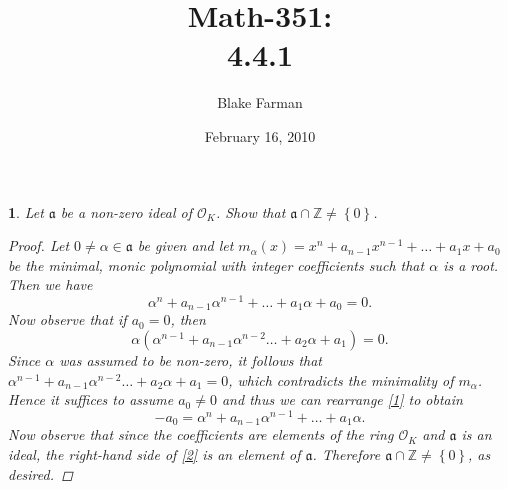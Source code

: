 \documentclass[10pt]{amsart}
\author{Blake Farman}
\title{Math-351:\\4.4.1}
\date{February 16, 2010}\pdfpagewidth 8.5in
\begin{document}
\maketitle

\newcommand{\Z}{\mathbb{Z}}
\newcommand{\R}{\mathbb{R}}
\newcommand{\Q}{\mathbb{Q}}

\renewcommand{\qedsymbol}{\(\blacksquare\)}
\newcommand{\znz}[1]{\Z / #1\Z}
\newcommand{\mznz}[1]{(\Z / #1\Z)^*}

\renewcommand{\phi}{\varphi}
\newenvironment{alphaenum}{
  \begin{enumerate}
    \renewcommand{\theenumi}{(\alph{enumi})}
    \renewcommand{\labelenumi}{\theenumi}
  }
  {\end{enumerate}}

\newcommand{\quadeq}[3]{\frac{-(#2) \pm \sqrt{(#2)^2 - 4(#1)(#3)}}{2(#3)}}

\newtheorem{thm}{}

\newcommand{\A}{\mathfrak{a}}
\begin{thm}
  Let $\A$ be a non-zero ideal of $\mathcal{O}_K$.  Show that $\mathfrak{a} \cap \Z \not = \left\{ 0 \right\}$.
  \begin{proof}
    Let $0 \not =\alpha \in \A$ be given and let $m_{\alpha}(x) = x^n + a_{n-1}x^{n-1} + \ldots + a_1x + a_0$ be the minimal, monic polynomial with integer coefficients such that $\alpha$ is a root.
    Then we have 
    \begin{equation}
      \label{1}
      \alpha^n + a_{n-1}\alpha^{n-1} + \ldots + a_1\alpha + a_0 = 0.
    \end{equation}
    Now observe that if $a_0 = 0$, then 
    $$\alpha(\alpha^{n-1} + a_{n-1}\alpha^{n-2} \ldots + a_2\alpha + a_1) = 0.$$
    Since $\alpha$ was assumed to be non-zero, it follows that $\alpha^{n-1} + a_{n-1}\alpha^{n-2} \ldots + a_2\alpha + a_1 = 0$, which contradicts the minimality of $m_{\alpha}$.
    Hence it suffices to assume $a_0 \not = 0$ and thus we can rearrange \eqref{1} to obtain
    \begin{equation}
      \label{2}
      -a_0 = {\alpha}^{n} + a_{n-1}{\alpha}^{n-1} + \ldots + a_1\alpha.
    \end{equation}
    Now observe that since the coefficients are elements of the ring $\mathcal{O}_K$ and $\mathfrak{a}$ is an ideal, the right-hand side of \eqref{2} is an element of $\mathfrak{a}$.
    Therefore $\mathfrak{a} \cap \Z \not = \left\{0\right\}$, as desired.
  \end{proof}
\end{thm}
\end{document}
